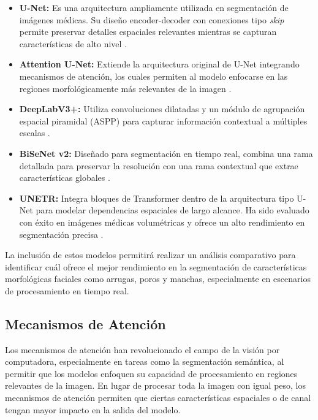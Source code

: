 \begin{itemize}
    \item \textbf{U-Net:} Es una arquitectura ampliamente utilizada en segmentación de imágenes médicas. Su diseño encoder-decoder con conexiones tipo \textit{skip} permite preservar detalles espaciales relevantes mientras se capturan características de alto nivel \cite{ronneberger2015unet}.

    \item \textbf{Attention U-Net:} Extiende la arquitectura original de U-Net integrando mecanismos de atención, los cuales permiten al modelo enfocarse en las regiones morfológicamente más relevantes de la imagen \cite{oktay2018attentionunet}.

    \item \textbf{DeepLabV3+:} Utiliza convoluciones dilatadas y un módulo de agrupación espacial piramidal (ASPP) para capturar información contextual a múltiples escalas \cite{chen2018deeplabv3plus}.

    \item \textbf{BiSeNet v2:} Diseñado para segmentación en tiempo real, combina una rama detallada para preservar la resolución con una rama contextual que extrae características globales \cite{yu2021bisenetv2}.

    \item \textbf{UNETR:} Integra bloques de Transformer dentro de la arquitectura tipo U-Net para modelar dependencias espaciales de largo alcance. Ha sido evaluado con éxito en imágenes médicas volumétricas y ofrece un alto rendimiento en segmentación precisa \cite{hatamizadeh2022unetr}.
\end{itemize}

La inclusión de estos modelos permitirá realizar un análisis comparativo para identificar cuál ofrece el mejor rendimiento en la segmentación de características morfológicas faciales como arrugas, poros y manchas, especialmente en escenarios de procesamiento en tiempo real.
\subsection{Mecanismos de Atención}
Los mecanismos de atención han revolucionado el campo de la visión por computadora, especialmente en tareas como la segmentación semántica, al permitir que los modelos enfoquen su capacidad de procesamiento en regiones relevantes de la imagen. En lugar de procesar toda la imagen con igual peso, los mecanismos de atención permiten que ciertas características espaciales o de canal tengan mayor impacto en la salida del modelo.

